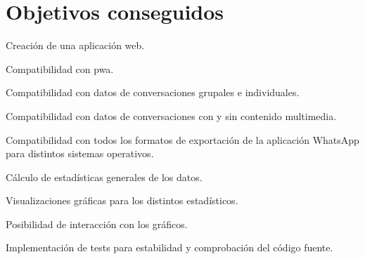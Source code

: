 \begin{comment}
The relevant idea behind the estimator developed in Section \ref{reamining_time_at_anytime} is that it can be understood as a system that corrects the estimations provided by another system. This could be an easy to implement solution for improving the accuracy of the estimations made by more complex systems just by setting it prior to them.

The main limitation for implementing the proposed online estimator is the bottleneck produced by the \acrshort{crtm} \acrshort{api} server, which would not be able to handle all the needed requests for sampling all the bus stops at the same time. Nevertheless, the computational cost of each of the used models was calculated in case that the processing capacity requirements were to be consider for a future implementation.

In general, the developed methods in this Project are built in a way that allows the usability for other similar use cases. The hyperparameters of the estimators are chosen based on the data and the available input features, so they can be easily adapted for different system behaviors.
\end{comment}

\section{Objetivos conseguidos}
\label{sec:achieved-goals}



\begin{description}
	
\item Creación de una aplicación web.
\item Compatibilidad con \acrfull{pwa}.
\item Compatibilidad con datos de conversaciones grupales e individuales.
\item Compatibilidad con datos de conversaciones con y sin contenido multimedia.
\item Compatibilidad con todos los formatos de exportación de la aplicación WhatsApp para distintos sistemas operativos.
\item Cálculo de estadísticas generales de los datos.
\item Visualizaciones gráficas para los distintos estadísticos.
\item Posibilidad de interacción con los gráficos.
\item Implementación de tests para estabilidad y comprobación del código fuente.

\end{description}

